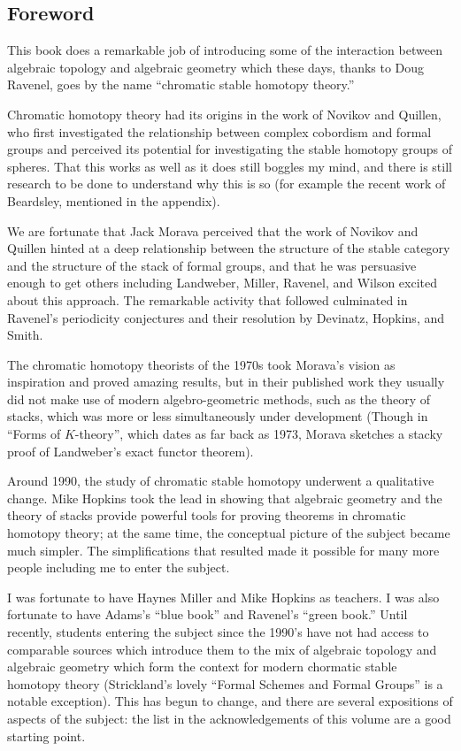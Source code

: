 
\subsection*{Foreword}

This book does a remarkable job of introducing some of the 
interaction between algebraic topology and algebraic geometry which
these days, thanks to Doug Ravenel, goes by the name ``chromatic
stable homotopy theory.''

Chromatic homotopy theory had its origins in the work of Novikov and
Quillen, who first investigated the relationship between complex
cobordism and formal groups and perceived its potential for
investigating the stable homotopy groups of spheres. That this works
as well as it does still boggles my mind, and there is still research
to be done to understand why this is so (for example the recent work
of Beardsley, mentioned in the appendix).  

We are fortunate that Jack Morava perceived that the work of Novikov
and Quillen hinted at a deep relationship between the structure of
the stable category and the structure of the stack of formal groups,
and that he was persuasive enough to get others including Landweber,
Miller, Ravenel, and Wilson excited about this approach. The
remarkable activity that followed culminated in  Ravenel's periodicity
conjectures and their resolution by Devinatz, Hopkins, and Smith. 

The chromatic homotopy theorists of the 1970s took Morava's
vision as inspiration and proved amazing results, but in their
published work they usually did not make use of modern
algebro-geometric methods, such as the theory of stacks, which was
more or less simultaneously under development (Though in
``Forms of $K$-theory'', which dates as far back as 1973, Morava sketches
a stacky proof of Landweber's exact functor theorem).

Around 1990, the study of chromatic stable homotopy underwent a
qualitative change. Mike Hopkins took the lead in
showing that algebraic geometry and the theory of stacks
provide powerful tools for proving theorems in chromatic homotopy
theory; at the same time, the conceptual picture of the subject became
much simpler.  The simplifications that resulted made it possible for
many more people including me to enter the subject. 

I was fortunate to have Haynes Miller and Mike Hopkins as
teachers.  I was also fortunate to have Adams's ``blue book'' and
Ravenel's ``green book.'' Until recently, students entering the
subject since the 1990's have not had access to comparable sources
which introduce them to the mix of algebraic topology and algebraic
geometry which form the context for  
modern chormatic stable homotopy theory (Strickland's 
lovely 
``Formal Schemes and Formal Groups'' is a notable exception).  This has
begun to change, and there are several expositions of aspects of the
subject: the list in the acknowledgements of this volume are a good
starting point.  

